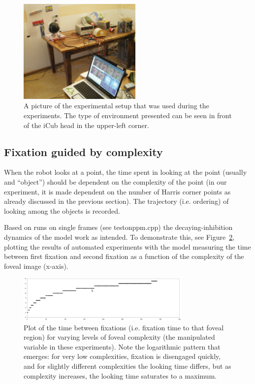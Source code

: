 \documentclass[conference]{IEEEtran}
\begin{document}
\begin{figure} [!t]
\centering \includegraphics[width=6.0cm]{icub_setup.jpg}
\caption{A picture of the experimental setup that was used during the
  experiments. The type of environment presented can be seen in front
  of the iCub head in the upper-left corner.}
\label{fig:icub_setup}
\end{figure}

\subsection{Fixation guided by complexity}
When the robot looks at a point, the time spent in looking at the
point (usually and ``object'') should be dependent on the complexity
of the point (in our experiment, it is made dependent on the number of
Harris corner points as already discussed in the previous
section). The trajectory (i.e. ordering) of looking among the objects
is recorded.

Based on runs on single frames (see testonppm.cpp) the
decaying-inhibition dynamics of the model work as intended. To
demonstrate this, see Figure~\ref{fig:complex_vs_fixtime}, plotting
the results of automated experiments with the model measuring the time
between first fixation and second fixation as a function of the
complexity of the foveal image (x-axis).
\begin{figure} [!t]
\centering
\includegraphics[width=8.5cm]{complex_vs_fixtime.png}
\caption{Plot of the time between fixations (i.e. fixation time to
  that foveal region) for varying levels of foveal complexity (the
  manipulated variable in these experiments). Note the logarithmic
  pattern that emerges: for very low complexities, fixation is
  disengaged quickly, and for slightly different complexities the
  looking time differs, but as complexity increases, the looking time
  saturates to a maximum.}
\label{fig:complex_vs_fixtime}
\end{figure}
\end{document}
